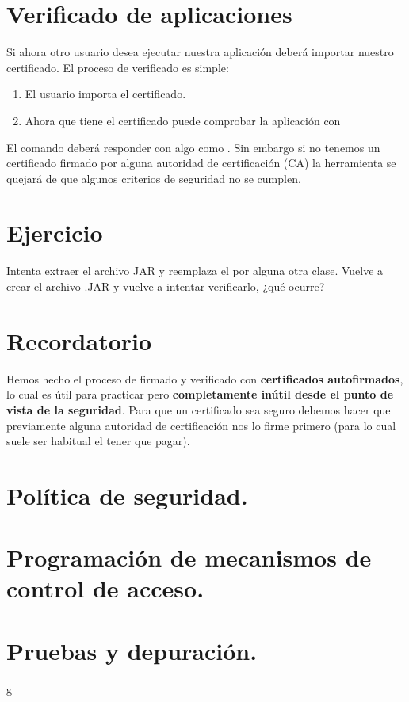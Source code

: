 \documentclass[a4paper,12pt,spanish]{sphinxmanual}
\begin{document}
\section{Verificado de aplicaciones}
\label{textos/tema5:verificado-de-aplicaciones}
Si ahora otro usuario desea ejecutar nuestra aplicación deberá importar nuestro certificado. El proceso de verificado es simple:
\begin{enumerate}
\item {} 
El usuario importa el certificado.

\item {} 
Ahora que tiene el certificado puede comprobar la aplicación con 

\end{enumerate}

El comando deberá responder con algo como . Sin embargo si no tenemos un certificado firmado por alguna autoridad de certificación (CA) la herramienta se quejará de que algunos criterios de seguridad no se cumplen.


\section{Ejercicio}
\label{textos/tema5:ejercicio}
Intenta extraer el archivo JAR y reemplaza el  por alguna otra clase. Vuelve a crear el archivo .JAR y vuelve a intentar verificarlo, ¿qué ocurre?


\section{Recordatorio}
\label{textos/tema5:recordatorio}
Hemos hecho el proceso de firmado y verificado con \textbf{certificados autofirmados}, lo cual es útil para practicar pero \textbf{completamente inútil desde el punto de vista de la seguridad}. Para que un certificado sea seguro debemos hacer que previamente alguna autoridad de certificación nos lo firme primero (para lo cual suele ser habitual el tener que pagar).


\section{Política de seguridad.}
\label{textos/tema5:politica-de-seguridad}

\section{Programación de mecanismos de control de acceso.}
\label{textos/tema5:programacion-de-mecanismos-de-control-de-acceso}

\section{Pruebas y depuración.}
\label{textos/tema5:pruebas-y-depuracion}
g



\renewcommand{\indexname}{Índice}
\printindex
\end{document}
